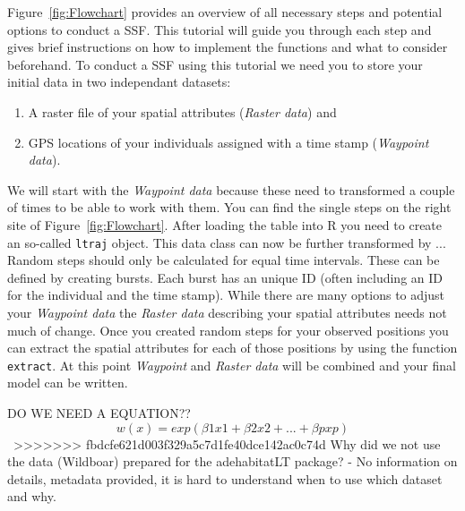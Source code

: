 \documentclass[11pt, a4paper]{article} %
\begin{document}
Figure~\ref{fig:Flowchart} provides an overview of all necessary steps and potential options to conduct a SSF. This tutorial will guide you through each step and gives brief instructions on how to implement the functions and what to consider beforehand.
To conduct a SSF using this tutorial we need you to store your initial data  in two independant datasets: \begin{enumerate} \item {A raster file of your spatial attributes (\emph{Raster data})} and \item{GPS locations of your individuals assigned with a time stamp (\emph{Waypoint data})}. \end{enumerate} 
We will start with the \emph{Waypoint data} because these need to transformed a couple of times to be able to work with them. You can find the single steps on the right site of Figure~\ref{fig:Flowchart}. After loading the table into R you need to create an so-called \texttt{ltraj} object. This data class can now be further transformed by ... Random steps should only be calculated for equal time intervals. These can be defined by creating bursts. Each burst has an unique ID (often including an ID for the individual and the time stamp). While there are many options to adjust your \emph{Waypoint data} the \emph{Raster data} describing your spatial attributes needs not much of change. Once you created random steps for your observed positions you can extract the spatial attributes for each of those positions by using the function \texttt{extract}. At this point \emph{Waypoint} and \emph{Raster data} will be combined and your final model can be written.   


DO WE NEED A EQUATION??
\[
\displaystyle w(x) = exp(\beta1 x1 + \beta2x2 + ... + \beta p xp)
\]
\
>>>>>>> fbdcfe621d003f329a5c7d1fe40dce142ac0c74d
Why did we not use the data (Wildboar) prepared for the adehabitatLT package? - No information on details, metadata provided, it is hard to understand when to use which dataset and why.
\newpage
\end{document}
